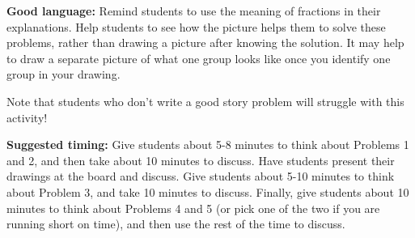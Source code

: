 \documentclass[nooutcomes,noauthor]{ximera}
\begin{document}
\begin{instructorNotes}
{\bf Good language:}  Remind students to use the meaning of fractions in their explanations. Help students to see how the picture helps them to solve these problems, rather than drawing a picture after knowing the solution. It may help to draw a separate picture of what one group looks like once you identify one group in your drawing.

Note that students who don't write a good story problem will struggle with this activity!

{\bf Suggested timing:} Give students about 5-8 minutes to think about Problems 1 and 2, and then take about 10 minutes to discuss. Have students present their drawings at the board and discuss. Give students about 5-10 minutes to think about Problem 3, and take 10 minutes to discuss. Finally, give students about 10 minutes to think about Problems 4 and 5 (or pick one of the two if you are running short on time), and then use the rest of the time to discuss.

\end{instructorNotes}
\end{document}
